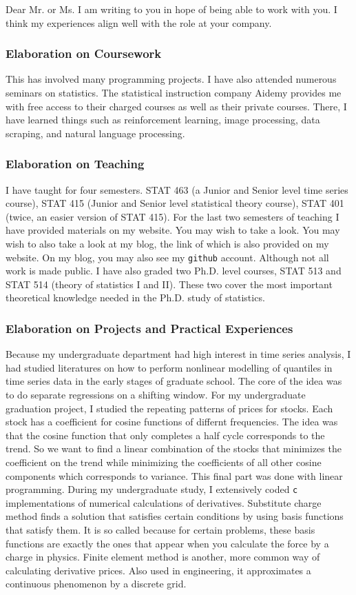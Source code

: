 \documentclass[utf8,letterpaper,oneside]{article}
\begin{document}
Dear Mr. or Ms.
\vskip 1cm
I am writing to you in hope of being able to work with you. I think my experiences align well with the role at your company.
\vskip 1cm
\subsubsection*{Elaboration on Coursework}
This has involved many programming projects. I have also attended numerous seminars on statistics. The statistical instruction company Aidemy provides me with free access to their charged courses as well as their private courses. There, I have learned things such as reinforcement learning, image processing, data scraping, and natural language processing.
\subsubsection*{Elaboration on Teaching}
I have taught for four semesters. STAT 463 (a Junior and Senior level time series course), STAT 415 (Junior and Senior level statistical theory course), STAT 401 (twice, an easier version of STAT 415). For the last two semesters of teaching I have provided materials on my website. You may wish to take a look. You may wish to also take a look at my blog, the link of which is also provided on my website. On my blog, you may also see my \texttt{github} account. Although not all work is made public. I have also graded two Ph.D. level courses, STAT 513 and STAT 514 (theory of statistics I and II). These two cover the most important theoretical knowledge needed in the Ph.D. study of statistics.
\subsubsection*{Elaboration on Projects and Practical Experiences}
Because my undergraduate department had high interest in time series analysis, I had studied literatures on how to perform nonlinear modelling of quantiles in time series data in the early stages of graduate school. The core of the idea was to do separate regressions on a shifting window. For my undergraduate graduation project, I studied the repeating patterns of prices for stocks. Each stock has a coefficient for cosine functions of differnt frequencies. The idea was that the cosine function that only completes a half cycle corresponds to the trend. So we want to find a linear combination of the stocks that minimizes the coefficient on the trend while minimizing the coefficients of all other cosine components which corresponds to variance. This final part was done with linear programming. During my undergraduate study, I extensively coded \texttt{c} implementations of numerical calculations of derivatives. Substitute charge method finds a solution that satisfies certain conditions by using basis functions that satisfy them. It is so called because for certain problems, these basis functions are exactly the ones that appear when you calculate the force by a charge in physics. Finite element method is another, more common way of calculating derivative prices. Also used in engineering, it approximates a continuous phenomenon by a discrete grid.
\end{document}
